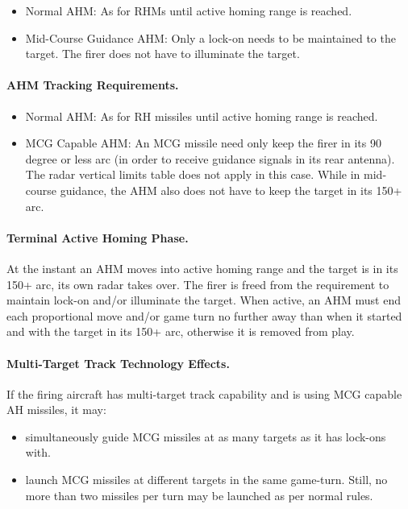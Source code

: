 \begin{itemize}

    \item Normal AHM: As for RHMs until active homing range is reached.

    \item Mid-Course Guidance AHM: Only a lock-on needs to be maintained to the target. The firer does not have to illuminate the target.  

\end{itemize}

\paragraph{AHM Tracking Requirements.}

\begin{itemize}

    \item Normal AHM: As for RH missiles until active homing range is reached.

    \item MCG Capable AHM: An MCG missile need only keep the firer in its 90 degree or less arc (in order to receive guidance signals in its rear antenna). The radar vertical limits table does not apply in this case. While in mid-course guidance, the AHM also does not have to keep the target in its 150+ arc.

\end{itemize}

\paragraph{Terminal Active Homing Phase.} At the instant an AHM moves into active homing range and the target is in its 150+ arc, its own radar takes over. The firer is freed from the requirement to maintain lock-on and/or illuminate the target.  When active, an AHM must end each proportional move and/or game turn no further away than when it started and with the target in its 150+ arc, otherwise it is removed from play.

\paragraph{Multi-Target Track Technology Effects.} If the firing aircraft has multi-target track capability and is using MCG capable AH missiles, it may:

\begin{itemize}

    \item simultaneously guide MCG missiles at as many targets as it has lock-ons with.

    \item launch MCG missiles at different targets in the same game-turn. Still, no more than two missiles per turn may be launched as per normal rules.

\end{itemize}

